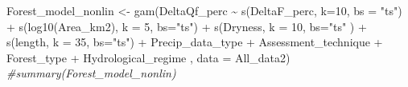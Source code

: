 \documentclass[]{elsarticle} %
\newenvironment{Shaded}{\begin{snugshade}}{\end{snugshade}}
\newcommand{\AttributeTok}[1]{\textcolor[rgb]{0.77,0.63,0.00}{#1}}
\newcommand{\CommentTok}[1]{\textcolor[rgb]{0.56,0.35,0.01}{\textit{#1}}}
\newcommand{\DecValTok}[1]{\textcolor[rgb]{0.00,0.00,0.81}{#1}}
\newcommand{\FunctionTok}[1]{\textcolor[rgb]{0.00,0.00,0.00}{#1}}
\newcommand{\NormalTok}[1]{#1}
\newcommand{\OtherTok}[1]{\textcolor[rgb]{0.56,0.35,0.01}{#1}}
\newcommand{\SpecialCharTok}[1]{\textcolor[rgb]{0.00,0.00,0.00}{#1}}
\newcommand{\StringTok}[1]{\textcolor[rgb]{0.31,0.60,0.02}{#1}}
\begin{document}
\begin{Shaded}
\begin{Highlighting}[]
\NormalTok{Forest\_model\_nonlin }\OtherTok{\textless{}{-}} \FunctionTok{gam}\NormalTok{(DeltaQf\_perc }\SpecialCharTok{\textasciitilde{}} \FunctionTok{s}\NormalTok{(DeltaF\_perc, }\AttributeTok{k=}\DecValTok{10}\NormalTok{, }\AttributeTok{bs =} \StringTok{"ts"}\NormalTok{) }\SpecialCharTok{+} 
                    \FunctionTok{s}\NormalTok{(}\FunctionTok{log10}\NormalTok{(Area\_km2), }\AttributeTok{k =} \DecValTok{5}\NormalTok{, }\AttributeTok{bs=}\StringTok{"ts"}\NormalTok{) }\SpecialCharTok{+} 
                    \FunctionTok{s}\NormalTok{(Dryness, }\AttributeTok{k =} \DecValTok{10}\NormalTok{, }\AttributeTok{bs=}\StringTok{"ts"}\NormalTok{ ) }\SpecialCharTok{+} 
                     \FunctionTok{s}\NormalTok{(length, }\AttributeTok{k =} \DecValTok{35}\NormalTok{, }\AttributeTok{bs=}\StringTok{"ts"}\NormalTok{) }\SpecialCharTok{+}
\NormalTok{                    Precip\_data\_type }\SpecialCharTok{+}\NormalTok{  Assessment\_technique }\SpecialCharTok{+}
\NormalTok{                    Forest\_type }\SpecialCharTok{+}
\NormalTok{                    Hydrological\_regime}
\NormalTok{                    , }\AttributeTok{data =}\NormalTok{ All\_data2)}
\CommentTok{\#summary(Forest\_model\_nonlin)}
\end{Highlighting}
\end{Shaded}
\end{document}
